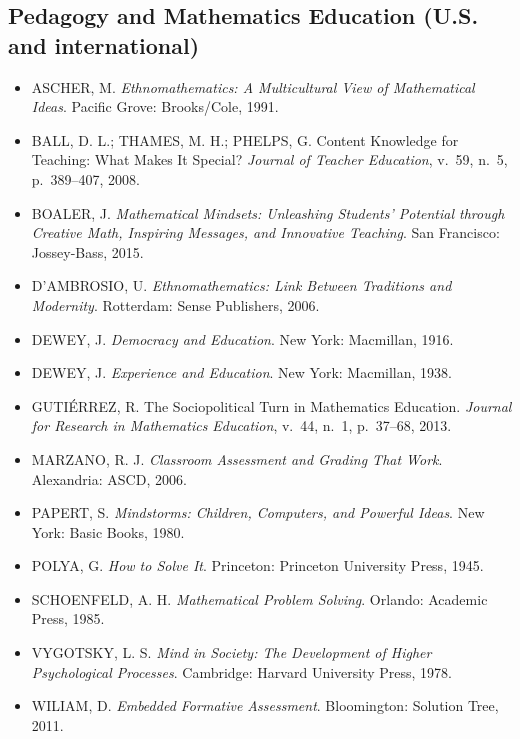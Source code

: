 \documentclass[12pt,a4paper]{scrartcl}
\begin{document}
\subsection{Pedagogy and Mathematics Education (U.S. and international)}
\begin{itemize}[leftmargin=1.3em,itemsep=0.15em,topsep=0.3em]
  \item ASCHER, M. \emph{Ethnomathematics: A Multicultural View of Mathematical Ideas}. Pacific Grove: Brooks/Cole, 1991.
  \item BALL, D. L.; THAMES, M. H.; PHELPS, G. Content Knowledge for Teaching: What Makes It Special? \emph{Journal of Teacher Education}, v.~59, n.~5, p.~389--407, 2008.
  \item BOALER, J. \emph{Mathematical Mindsets: Unleashing Students' Potential through Creative Math, Inspiring Messages, and Innovative Teaching}. San Francisco: Jossey-Bass, 2015.
  \item D'AMBROSIO, U. \emph{Ethnomathematics: Link Between Traditions and Modernity}. Rotterdam: Sense Publishers, 2006.
  \item DEWEY, J. \emph{Democracy and Education}. New York: Macmillan, 1916.
  \item DEWEY, J. \emph{Experience and Education}. New York: Macmillan, 1938.
  \item GUTIÉRREZ, R. The Sociopolitical Turn in Mathematics Education. \emph{Journal for Research in Mathematics Education}, v.~44, n.~1, p.~37--68, 2013.
  \item MARZANO, R. J. \emph{Classroom Assessment and Grading That Work}. Alexandria: ASCD, 2006.
  \item PAPERT, S. \emph{Mindstorms: Children, Computers, and Powerful Ideas}. New York: Basic Books, 1980.
  \item POLYA, G. \emph{How to Solve It}. Princeton: Princeton University Press, 1945.
  \item SCHOENFELD, A. H. \emph{Mathematical Problem Solving}. Orlando: Academic Press, 1985.
  \item VYGOTSKY, L. S. \emph{Mind in Society: The Development of Higher Psychological Processes}. Cambridge: Harvard University Press, 1978.
  \item WILIAM, D. \emph{Embedded Formative Assessment}. Bloomington: Solution Tree, 2011.
\end{itemize}
\end{document}
